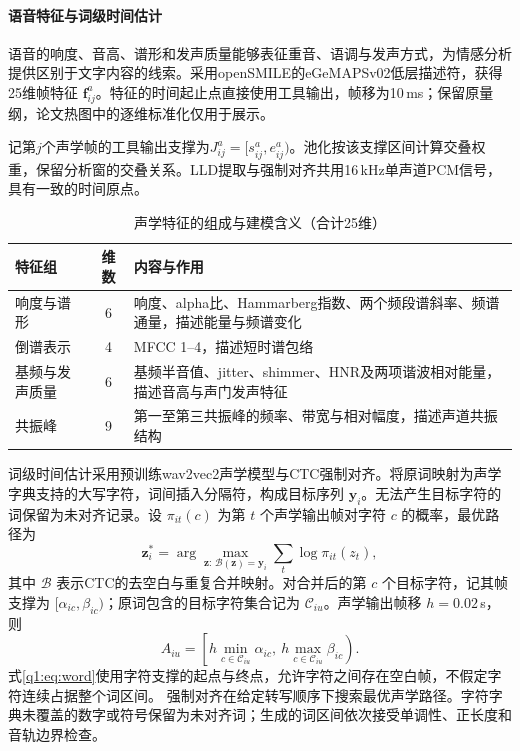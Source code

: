 \paragraph{语音特征与词级时间估计}

语音的响度、音高、谱形和发声质量能够表征重音、语调与发声方式，为情感分析提供区别于文字内容的线索。采用openSMILE的eGeMAPSv02低层描述符，获得25维帧特征 $\bm f^a_{ij}$。特征的时间起止点直接使用工具输出，帧移为10\,ms；保留原量纲，论文热图中的逐维标准化仅用于展示。

记第$j$个声学帧的工具输出支撑为$J^a_{ij}=[s^a_{ij},e^a_{ij})$。池化按该支撑区间计算交叠权重，保留分析窗的交叠关系。LLD提取与强制对齐共用16\,kHz单声道PCM信号，具有一致的时间原点。

\begin{table}[htbp]
\centering\small
\caption{声学特征的组成与建模含义（合计25维）}
\begin{tabularx}{\linewidth}{>{\raggedright\arraybackslash}p{2.7cm}cY}
\toprule
特征组 & 维数 & 内容与作用 \\
\midrule
响度与谱形 & 6 & 响度、alpha比、Hammarberg指数、两个频段谱斜率、频谱通量，描述能量与频谱变化 \\
倒谱表示 & 4 & MFCC 1--4，描述短时谱包络 \\
基频与发声质量 & 6 & 基频半音值、jitter、shimmer、HNR及两项谐波相对能量，描述音高与声门发声特征 \\
共振峰 & 9 & 第一至第三共振峰的频率、带宽与相对幅度，描述声道共振结构 \\
\bottomrule
\end{tabularx}
\end{table}

词级时间估计采用预训练wav2vec2声学模型与CTC强制对齐。将原词映射为声学字典支持的大写字符，词间插入分隔符，构成目标序列 $\bm y_i$。无法产生目标字符的词保留为未对齐记录。设 $\pi_{it}(c)$ 为第 $t$ 个声学输出帧对字符 $c$ 的概率，最优路径为
\begin{equation}
\bm z_i^*=\arg\max_{\bm z:\,\mathcal B(\bm z)=\bm y_i}
\sum_t\log\pi_{it}(z_t),
\label{q1:eq:ctc}
\end{equation}
其中 $\mathcal B$ 表示CTC的去空白与重复合并映射。对合并后的第 $c$ 个目标字符，记其帧支撑为 $[\alpha_{ic},\beta_{ic})$；原词包含的目标字符集合记为 $\mathcal C_{iu}$。声学输出帧移 $h=0.02$\,s，则
\begin{equation}
A_{iu}=\left[h\min_{c\in\mathcal C_{iu}}\alpha_{ic},\ 
h\max_{c\in\mathcal C_{iu}}\beta_{ic}\right).
\label{q1:eq:word}
\end{equation}
式\eqref{q1:eq:word}使用字符支撑的起点与终点，允许字符之间存在空白帧，不假定字符连续占据整个词区间。
强制对齐在给定转写顺序下搜索最优声学路径\cite{ref:ctc}。字符字典未覆盖的数字或符号保留为未对齐词；生成的词区间依次接受单调性、正长度和音轨边界检查。

